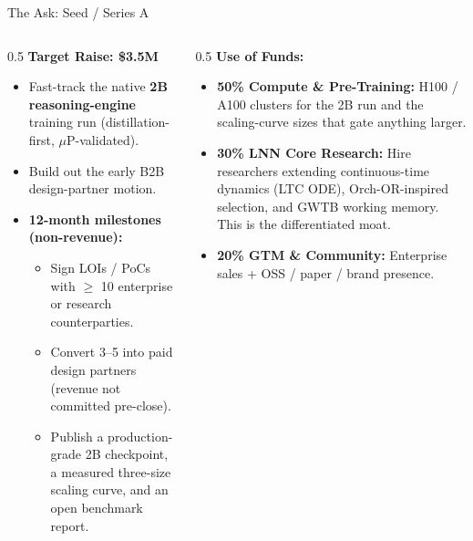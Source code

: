 ﻿\documentclass[aspectratio=169, 10pt]{beamer}
\begin{document}
\begin{frame}{The Ask: Seed / Series A}
\begin{columns}
\begin{column}{0.5\textwidth}
\textbf{Target Raise: \$3.5M}
\vspace{0.5em}
\begin{itemize}
    \item Fast-track the native \textbf{2B reasoning-engine} training run (distillation-first, $\mu$P-validated).
    \item Build out the early B2B design-partner motion.
    \item \textbf{12-month milestones (non-revenue):}
    \begin{itemize}\footnotesize
        \item Sign LOIs / PoCs with $\geq$ 10 enterprise or research counterparties.
        \item Convert 3--5 into paid design partners (revenue not committed pre-close).
        \item Publish a production-grade 2B checkpoint, a measured three-size scaling curve, and an open benchmark report.
    \end{itemize}
\end{itemize}
\end{column}
\begin{column}{0.5\textwidth}
\textbf{Use of Funds:}
\begin{itemize}
    \item \textbf{50\% Compute \& Pre-Training:} H100 / A100 clusters for the 2B run and the scaling-curve sizes that gate anything larger.
    \item \textbf{30\% LNN Core Research:} Hire researchers extending continuous-time dynamics (LTC ODE), Orch-OR-inspired selection, and GWTB working memory. This is the differentiated moat.
    \item \textbf{20\% GTM \& Community:} Enterprise sales + OSS / paper / brand presence.
\end{itemize}
\end{column}
\end{columns}
\end{frame}
\end{document}
